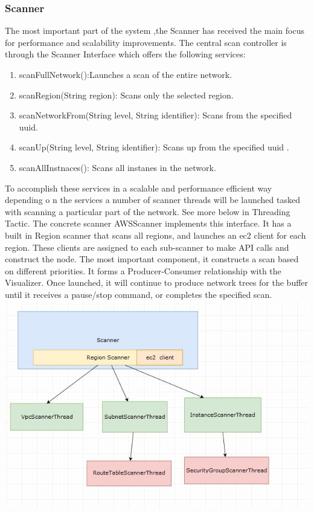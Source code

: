 \documentclass[hidelinks,a4paper,12pt]{article}
\begin{document}
\subsubsection{Scanner}
The most important part of the system ,the Scanner has received the main focus for performance and scalability improvements. The central scan controller is through the Scanner Interface which offers the following services:
\begin{enumerate} 
\item scanFullNetwork():Launches a scan of the entire network.
\item scanRegion(String region): Scans only the selected region.
\item scanNetworkFrom(String level, String identifier): Scans from the specified uuid.
\item scanUp(String level, String identifier): Scans up from the specified uuid .
\item scanAllInstnaces(): Scans all instanes in the network.

\end{enumerate}

To accomplish these services in a scalable and performance efficient way depending o n the services a number of scanner threads will be launched tasked with scanning a particular part of the network. See more below in Threading Tactic.
The concrete scanner AWSScanner implements this interface. It has a built in Region scanner that scans all regions, and launches an ec2 client for each region. These clients are assigned to each sub-scanner to make API calls and construct the node.
The most important component, it constructs a scan based on different priorities. It forms a Producer-Consumer relationship with the Visualizer. Once launched, it will continue to produce network trees for the buffer until it receives a pause/stop command, or completes the specified scan.
\includegraphics[width=1.00\textwidth]{./images/scanner.jpg}\\[0.4cm] 
\end{document}
